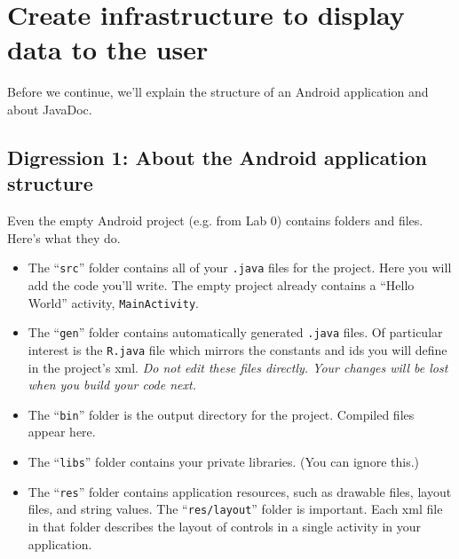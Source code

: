 \documentclass[10pt]{article}
\begin{document}
\section{Create infrastructure to display data to the user}
Before we continue, we'll explain the structure of an Android application and about JavaDoc.
\subsection{Digression 1: About the Android application structure}
Even the empty Android project (e.g. from Lab 0) contains folders and files. Here's what they do.
\begin{itemize}
\item The ``{\tt src}'' folder contains all of your {\tt .java} files for the project. Here you will add the code you'll write. The empty project already contains a ``Hello World'' activity, {\tt MainActivity}.
\item The ``{\tt gen}'' folder contains automatically generated {\tt .java} files. Of particular interest is the {\tt R.java} file which mirrors the constants and ids you will define in the project's xml. \emph{Do not edit these files directly. Your changes will be lost when you build your code next.}
\item The ``{\tt bin}'' folder is the output directory for the project. Compiled files appear here.
\item The ``{\tt libs}'' folder contains your private libraries. (You can ignore this.)
\item The ``{\tt res}'' folder contains application resources, such as drawable files, layout files, and string values. The ``{\tt res/layout}'' folder is important. Each xml file in that folder describes the layout of controls in a single activity in your application. %
\end{itemize}
\end{document}
